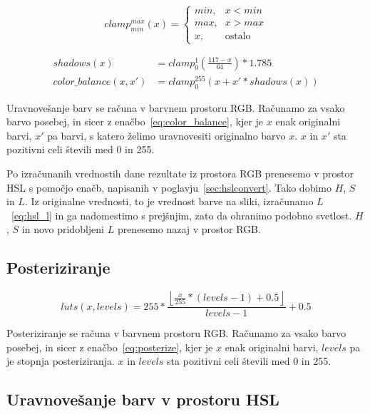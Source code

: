 \documentclass[a4paper, 12pt]{book}
\begin{document}
\begin{equation}
clamp_{min}^{max}(x) =
\begin{cases}
    min \text{,}& x < min \\
    max \text{,}& x > max \\
    x \text{,}& \text{ostalo}
\end{cases}
\end{equation}

\begin{align}
shadows(x) &= clamp_{0}^{1}(\frac{117 - x}{64}) * 1.785 \\
color\_balance(x, x') &= clamp_{0}^{255}(x + x' * shadows(x)) \label{eq:color_balance}
\end{align}

Uravnovešanje barv se računa v barvnem prostoru RGB. Računamo za vsako
barvo posebej, in sicer z enačbo~\eqref{eq:color_balance}, kjer je $x$ enak
originalni barvi, $x'$ pa barvi, s katero želimo uravnovesiti originalno barvo
$x$. $x$ in $x'$ sta pozitivni celi števili med 0 in 255.

Po izračunanih vrednostih dane rezultate iz prostora RGB prenesemo v prostor HSL
s pomočjo enačb, napisanih v poglavju~\ref{sec:hslconvert}. Tako dobimo $H$,
$S$ in $L$. Iz originalne vrednosti, to je vrednost barve na sliki,
izračunamo $L$~\eqref{eq:hsl_l} in ga nadomestimo s prejšnjim, zato da ohranimo
podobno svetlost. $H$, $S$ in novo pridobljeni $L$ prenesemo nazaj v prostor RGB.


\subsection{Posteriziranje}
\label{sec:obdelavaSlikPosteriziranje}

\begin{equation}
luts(x, levels) = 255 * \frac{\left \lfloor{\frac{x}{255} * (levels - 1) + 0.5}\right \rfloor}{levels - 1} + 0.5 \label{eq:posterize}
\end{equation}

Posteriziranje se računa v barvnem prostoru RGB. Računamo za vsako barvo
posebej, in sicer z enačbo~\eqref{eq:posterize}, kjer je $x$ enak
originalni barvi, $levels$ pa je stopnja posteriziranja. $x$
in $levels$ sta pozitivni celi števili med 0 in 255.


\subsection{Uravnovešanje barv v prostoru HSL}
\label{sec:obdelavaSlikUravnovesanjeBarvHSL}
\end{document}
